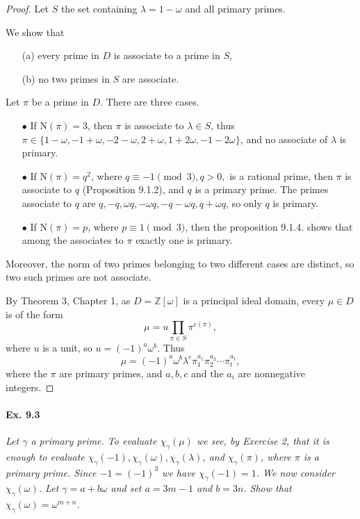 \documentclass[11pt,a4paper]{article}
\newcommand{\Z}{\mathbb{Z}}
\newcommand{\n}{\mathrm{N}}
\begin{document}
\begin{proof}

Let $S$ the set containing $\lambda = 1 - \omega$ and all primary primes. 

We show that
\begin{enumerate}
\item[(a)] every prime in $D$ is associate to a prime in $S$,
\item[(b)] no two primes in $S$ are associate.
\end{enumerate}

 Let $\pi$ be a prime in $D$. There are three cases.

  \begin{enumerate}
  \item[$\bullet$] If $\n(\pi) = 3$, then $\pi$ is associate to $\lambda \in S$, thus $\pi \in \{1-\omega, -1+\omega, -2 - \omega, 2 + \omega, 1 + 2\omega, -1-2\omega\}$, and no associate of $\lambda$ is primary.
  \item[$\bullet$] If $\n(\pi) = q^2$, where $q \equiv -1 \pmod 3, q>0,$ is a rational prime, then $\pi$ is associate to $q$ (Proposition 9.1.2), and $q$ is a primary prime.
  	The primes associate to $q$ are $q, -q, \omega q, -\omega q, -q - \omega q, q + \omega q$, so only $q$ is primary.
  \item[$\bullet$] If $\n(\pi) = p$, where $p \equiv 1 \pmod 3$, then the proposition 9.1.4. shows that among the associates to $\pi$ exactly one is primary.
  \end{enumerate}
   Moreover, the norm of two primes belonging to two different cases are distinct, so two such primes are not associate.

By Theorem 3, Chapter 1, as $D = \Z[\omega]$ is a principal ideal domain,  every $\mu \in D$ is of the form
$$\mu = u \prod_{\pi \in S} \pi^{e(\pi)},$$
where $u$ is a unit, so $u = (-1)^a\omega^b$. Thus
$$\mu = (-1)^a \omega^b \lambda^c\pi_1^{a_1}\pi_2^{a_2}\cdots\pi_t^{a_t},$$ where the $\pi$ are primary primes, and $a,b,c$ and the $a_i$ are nonnegative integers.
\end{proof}

\paragraph{Ex. 9.3}

{\it Let $\gamma$ a primary prime. To evaluate $\chi_\gamma(\mu)$ we see, by Exercise 2, that it is enough to evaluate $\chi_\gamma(-1), \chi_\gamma(\omega), \chi_\gamma(\lambda)$, and $\chi_\gamma(\pi)$, where $\pi$ is a primary prime. Since $-1 =(-1)^3$ we have $\chi_\gamma(-1) = 1$. We now consider $\chi_\gamma(\omega)$. Let $\gamma = a+b \omega$ and set $a = 3m -1$ and $b=3n$. Show that $\chi_\gamma(\omega) = \omega^{m+n}$.
}
\end{document}
